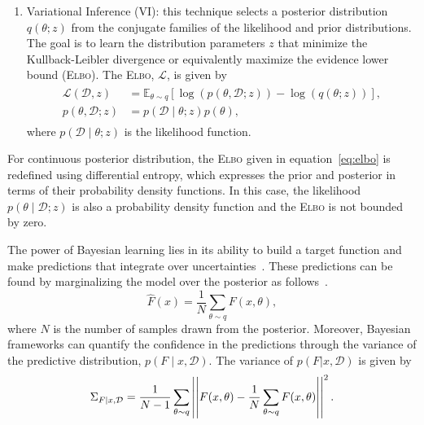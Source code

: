 \begin{enumerate}
%
\item Variational Inference (VI): this technique selects a posterior
distribution $q(\theta;z)$ from the conjugate families of the likelihood and
prior distributions. The goal is to learn the distribution parameters $z$ that
minimize the Kullback-Leibler divergence or equivalently maximize the evidence
lower bound (\textsc{Elbo}). The \textsc{Elbo}, $\mathcal{L}$, is given
by~\cite{cohen2016bayesian}
\begin{align}
  \begin{split}
  \mathcal{L}(\mathcal{D},z) &= \mathbb{E}_{\theta \sim q} \left[\log(p(\theta, \mathcal{D};z)) - \log(q(\theta;z)) \right], \\
  p(\theta, \mathcal{D};z) &= p(\mathcal{D} \mid \theta;z)p(\theta),
  \end{split}
  \label{eq:elbo}
\end{align}
where $p(\mathcal{D} \mid \theta;z)$ is the likelihood function. 
\end{enumerate}
\begin{rem}
  For continuous posterior distribution, the \textsc{Elbo} given in
  equation~\eqref{eq:elbo} is redefined using differential entropy, which
  expresses the prior and posterior in terms of their probability density
  functions. In this case, the likelihood $p(\theta \mid \mathcal{D};z)$ is also
  a probability density function and the \textsc{Elbo} is not bounded by zero.
\end{rem}

The power of Bayesian learning lies in its ability to build a target function
and make predictions that integrate over
uncertainties~\cite{tipping2003bayesian}. These predictions can be found by
marginalizing the model over the posterior as follows~\cite{jospin2020hands}.
\begin{equation}
  \hat{F}(x) = \frac{1}{N} \sum_{\theta \sim q} F(x, \theta),
  \label{eqn:marginalization}
\end{equation} 
where $N$ is the number of samples drawn from the posterior. Moreover, Bayesian
frameworks can quantify the confidence in the predictions through the variance
of the predictive distribution, $p(F \mid x, \mathcal{D})$. The variance of
$p(F|x, \mathcal{D})$ is given by~\cite{jospin2020hands}
\begin{equation}
  \Sigma_{F \mid x,\mathcal{D}} = \frac{1}{N-1} \sum_{\theta \sim q} \left|\left|F(x,\theta) - \frac{1}{N} \sum_{\theta \sim q} F(x, \theta)\right|\right|^2.
  \label{eqn:predictive_variance}
\end{equation}
%

